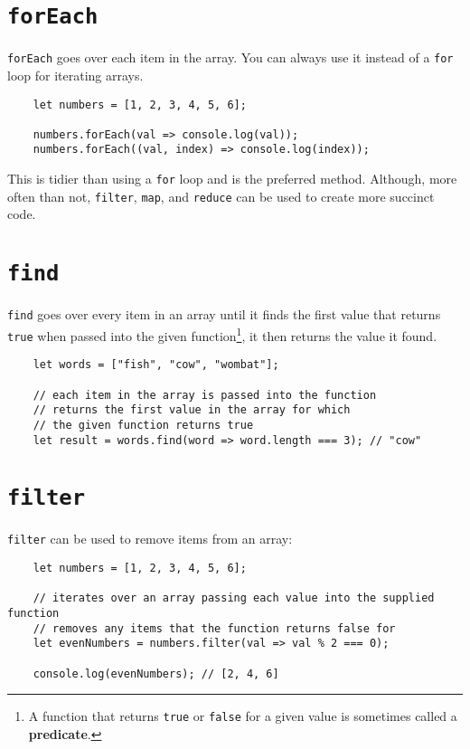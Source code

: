 \section{\texttt{forEach}}

\texttt{forEach} goes over each item in the array. You can always use it instead of a \texttt{for} loop for iterating arrays.

\begin{verbatim}
    let numbers = [1, 2, 3, 4, 5, 6];

    numbers.forEach(val => console.log(val));
    numbers.forEach((val, index) => console.log(index));
\end{verbatim}

This is tidier than using a \texttt{for} loop and is the preferred method. Although, more often than not, \texttt{filter}, \texttt{map}, and \texttt{reduce} can be used to create more succinct code.



\section{\texttt{find}}

\texttt{find} goes over every item in an array until it finds the first value that returns \texttt{true} when passed into the given function\footnote{A function that returns \texttt{true} or \texttt{false} for a given value is sometimes called a \textbf{predicate}.}, it then returns the value it found.

\begin{verbatim}
    let words = ["fish", "cow", "wombat"];

    // each item in the array is passed into the function
    // returns the first value in the array for which
    // the given function returns true
    let result = words.find(word => word.length === 3); // "cow"
\end{verbatim}



\section{\texttt{filter}}

\texttt{filter} can be used to remove items from an array:

\begin{verbatim}
    let numbers = [1, 2, 3, 4, 5, 6];

    // iterates over an array passing each value into the supplied function
    // removes any items that the function returns false for
    let evenNumbers = numbers.filter(val => val % 2 === 0);

    console.log(evenNumbers); // [2, 4, 6]
\end{verbatim}

